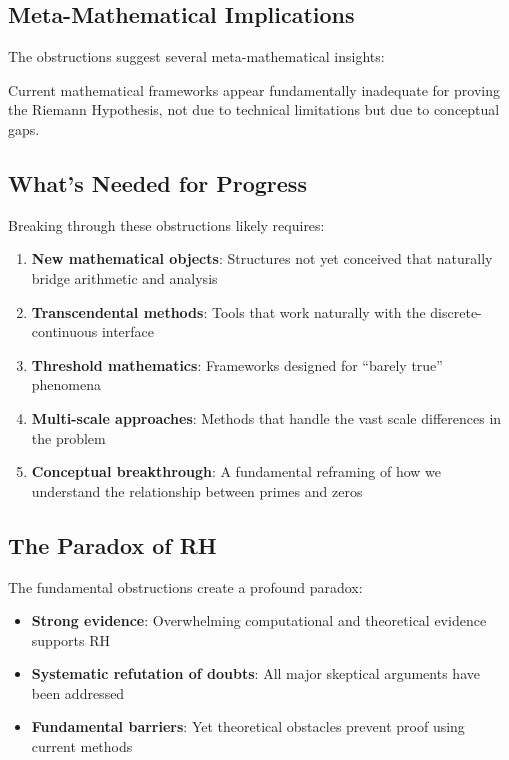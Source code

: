 \subsection{Meta-Mathematical Implications}

The obstructions suggest several meta-mathematical insights:

\begin{theorem}
Current mathematical frameworks appear fundamentally inadequate for proving the Riemann Hypothesis, not due to technical limitations but due to conceptual gaps.
\end{theorem}

\subsection{What's Needed for Progress}

Breaking through these obstructions likely requires:

\begin{enumerate}
\item \textbf{New mathematical objects}: Structures not yet conceived that naturally bridge arithmetic and analysis

\item \textbf{Transcendental methods}: Tools that work naturally with the discrete-continuous interface

\item \textbf{Threshold mathematics}: Frameworks designed for ``barely true'' phenomena

\item \textbf{Multi-scale approaches}: Methods that handle the vast scale differences in the problem

\item \textbf{Conceptual breakthrough}: A fundamental reframing of how we understand the relationship between primes and zeros
\end{enumerate}

\subsection{The Paradox of RH}

The fundamental obstructions create a profound paradox:

\begin{itemize}
\item \textbf{Strong evidence}: Overwhelming computational and theoretical evidence supports RH
\item \textbf{Systematic refutation of doubts}: All major skeptical arguments have been addressed
\item \textbf{Fundamental barriers}: Yet theoretical obstacles prevent proof using current methods
\end{itemize}

